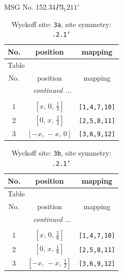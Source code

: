 \documentclass[fleqn,8pt]{jsarticle}
\begin{document}
\setcounter{MaxMatrixCols}{32}

\renewcommand{\tablename}{Table~}
\renewcommand{\figurename}{Figure~}
\begin{center}
\LARGE
MSG No. 152.34\quad$P3_{1}211'$
\end{center}
\renewcommand{\arraystretch}{1.2}
\begin{longtable}{ccc}
\caption{Wyckoff site: {\tt 3a}, site symmetry: {\tt .2.1'}}
 \\
 \hline \hline
No. & position & mapping \\ \hline \endfirsthead

\multicolumn{2}{l}{\tablename\ \thetable{}} \\
 \hline \hline
No. & position & mapping \\ \hline \endhead

 \hline \hline
\multicolumn{2}{r}{\footnotesize\it continued ...} \\ \endfoot

 \hline \hline
\multicolumn{2}{r}{} \\ \endlastfoot

1 & $\left[ x,\, 0,\, \frac{1}{3} \right]$ & {\tt [1,4,7,10]} \\ \hline
2 & $\left[ 0,\, x,\, \frac{2}{3} \right]$ & {\tt [2,5,8,11]} \\ \hline
3 & $\left[ - x,\, - x,\, 0 \right]$ & {\tt [3,6,9,12]} \\
\end{longtable}
\renewcommand{\arraystretch}{1.2}
\begin{longtable}{ccc}
\caption{Wyckoff site: {\tt 3b}, site symmetry: {\tt .2.1'}}
 \\
 \hline \hline
No. & position & mapping \\ \hline \endfirsthead

\multicolumn{2}{l}{\tablename\ \thetable{}} \\
 \hline \hline
No. & position & mapping \\ \hline \endhead

 \hline \hline
\multicolumn{2}{r}{\footnotesize\it continued ...} \\ \endfoot

 \hline \hline
\multicolumn{2}{r}{} \\ \endlastfoot

1 & $\left[ x,\, 0,\, \frac{5}{6} \right]$ & {\tt [1,4,7,10]} \\ \hline
2 & $\left[ 0,\, x,\, \frac{1}{6} \right]$ & {\tt [2,5,8,11]} \\ \hline
3 & $\left[ - x,\, - x,\, \frac{1}{2} \right]$ & {\tt [3,6,9,12]} \\
\end{longtable}
\end{document}
